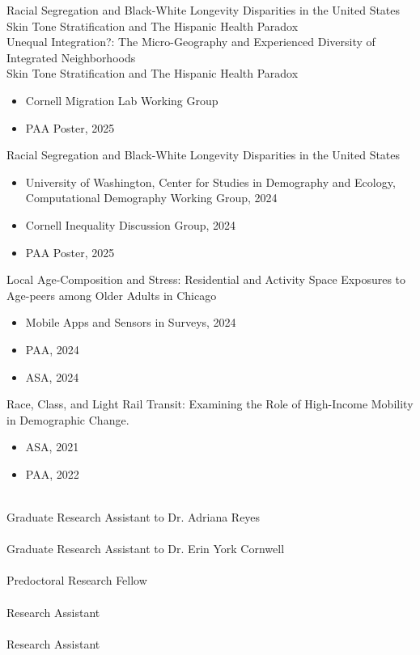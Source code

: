 \documentclass[11pt]{article} %
\begin{document}

Racial Segregation and Black-White Longevity Disparities in the United States \\

Skin Tone Stratification and The Hispanic Health Paradox \\

Unequal Integration?: The Micro-Geography and Experienced Diversity of Integrated Neighborhoods \\

Skin Tone Stratification and The Hispanic Health Paradox
\begin{itemize}
\item  Cornell Migration Lab Working Group
\item PAA Poster, 2025
\end{itemize}

Racial Segregation and Black-White Longevity Disparities in the United States 
\begin{itemize}
\item  University of Washington, Center for Studies in Demography and Ecology, Computational Demography Working Group, 2024
\item Cornell Inequality Discussion Group, 2024
\item PAA Poster, 2025
\end{itemize}
Local Age-Composition and Stress: Residential and Activity Space Exposures to Age-peers among Older Adults in Chicago
\begin{itemize}
\item Mobile Apps and Sensors in Surveys, 2024
\item PAA, 2024 
\item ASA, 2024
\end{itemize}
Race, Class, and Light Rail Transit: Examining the Role of High-Income Mobility in Demographic Change. 
\begin{itemize}
\item ASA, 2021
\item PAA, 2022
\end{itemize}
 \\ 
Graduate Research Assistant to Dr. Adriana Reyes \\
 \\ 
Graduate Research Assistant to Dr. Erin York Cornwell \\  
 \\ Predoctoral Research Fellow \\
 \\ Research Assistant \\ 
 \\ Research Assistant \\ 
\end{document}
